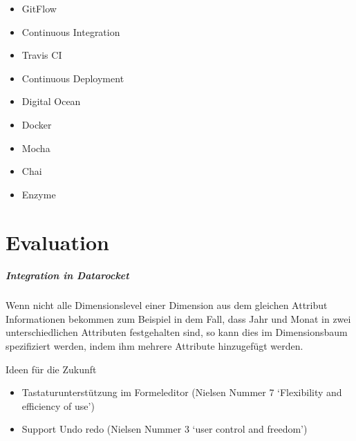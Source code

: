 \documentclass[
  language=german, %
  type=bachelor%
]{isthesis}
\begin{document}
\begin{content}
  \begin{itemize}
    \item GitFlow
    \item Continuous Integration
    \item Travis CI
    \item Continuous Deployment
    \item Digital Ocean
    \item Docker
    \item Mocha
    \item Chai
    \item Enzyme
  \end{itemize}


\chapter{Evaluation}
 \paragraph{Integration in \textit{Datarocket}}
 Wenn nicht alle Dimensionslevel einer Dimension aus dem gleichen Attribut
 Informationen bekommen zum Beispiel in dem Fall, dass Jahr und Monat in zwei
 unterschiedlichen Attributen festgehalten sind, so kann dies im Dimensionsbaum
 spezifiziert werden, indem ihm mehrere Attribute hinzugefügt werden.

  \begin{figure}[caption={\textit{DataRockets} \textit{Datapipeline}-Bausteine}, label={}]
  \end{figure}

	Ideen für die Zukunft
	\begin{itemize}
    \item Tastaturunterstützung im Formeleditor (Nielsen Nummer 7 `Flexibility
      and efficiency of use')
    \item Support Undo redo (Nielsen Nummer 3 `user control and freedom')
	\end{itemize}


\end{content}
\end{document}
